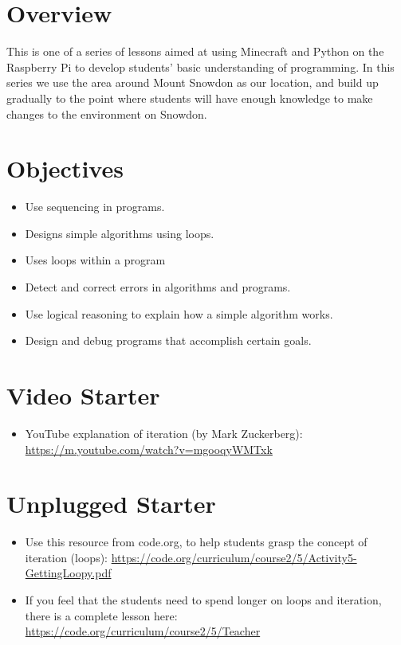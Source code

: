 \documentclass{geocraft-lesson-plan}
\begin{document}
\subtitle{Part 2 - Iteration}

\section*{Overview}
This is one of a series of lessons aimed at using Minecraft and Python
on the Raspberry Pi to develop students’ basic understanding of
programming. In this series we use the area around Mount Snowdon as
our location, and build up gradually to the point where students will
have enough knowledge to make changes to the environment on Snowdon.  

\section*{Objectives}
\begin{itemize}
\item Use sequencing in programs.
\item Designs simple algorithms using loops.
\item Uses loops within a program
\item Detect and correct errors in algorithms and programs.
\item Use logical reasoning to explain how a simple algorithm works. 
\item Design and debug programs that accomplish certain goals.
\end{itemize}

\section*{Video Starter}
\begin{itemize}
\item YouTube explanation of iteration (by Mark Zuckerberg):
 {\textcolor{greenish} 
  {\url{ https://m.youtube.com/watch?v=mgooqyWMTxk}}} 
\end{itemize}

\section*{Unplugged Starter}
\begin{itemize}
\item Use this resource from code.org, to help students grasp the
  concept of iteration (loops): 
  {\textcolor{greenish}
    {\url{https://code.org/curriculum/course2/5/Activity5-GettingLoopy.pdf}}} 
\item If you feel that the students need to spend longer on loops and 
  iteration, there is a complete lesson here: 
  {\textcolor{greenish}
    {\url{https://code.org/curriculum/course2/5/Teacher}}} 
\end{itemize}
\end{document}
